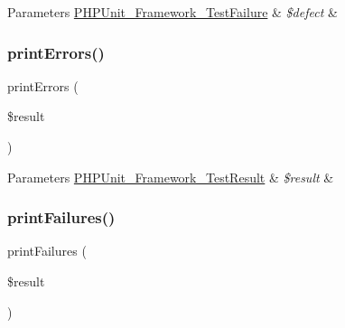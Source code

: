 \begin{DoxyParams}[1]{Parameters}
\mbox{\hyperlink{class_p_h_p_unit___framework___test_failure}{P\+H\+P\+Unit\+\_\+\+Framework\+\_\+\+Test\+Failure}} & {\em \$defect} & \\
\hline
\end{DoxyParams}
\mbox{\label{class_p_h_p_unit___text_u_i___result_printer_a9a1da341042f7390084b71daf14e849e}} 
\subsubsection{\texorpdfstring{print\+Errors()}{printErrors()}}
{\footnotesize\ttfamily print\+Errors (\begin{DoxyParamCaption}\item[{\mbox{\hyperlink{class_p_h_p_unit___framework___test_result}{P\+H\+P\+Unit\+\_\+\+Framework\+\_\+\+Test\+Result}}}]{\$result }\end{DoxyParamCaption})\hspace{0.3cm}{\ttfamily [protected]}}


\begin{DoxyParams}[1]{Parameters}
\mbox{\hyperlink{class_p_h_p_unit___framework___test_result}{P\+H\+P\+Unit\+\_\+\+Framework\+\_\+\+Test\+Result}} & {\em \$result} & \\
\hline
\end{DoxyParams}
\mbox{\label{class_p_h_p_unit___text_u_i___result_printer_ab40a908faef35c94529c4cba18c49835}} 
\subsubsection{\texorpdfstring{print\+Failures()}{printFailures()}}
{\footnotesize\ttfamily print\+Failures (\begin{DoxyParamCaption}\item[{\mbox{\hyperlink{class_p_h_p_unit___framework___test_result}{P\+H\+P\+Unit\+\_\+\+Framework\+\_\+\+Test\+Result}}}]{\$result }\end{DoxyParamCaption})\hspace{0.3cm}{\ttfamily [protected]}}


